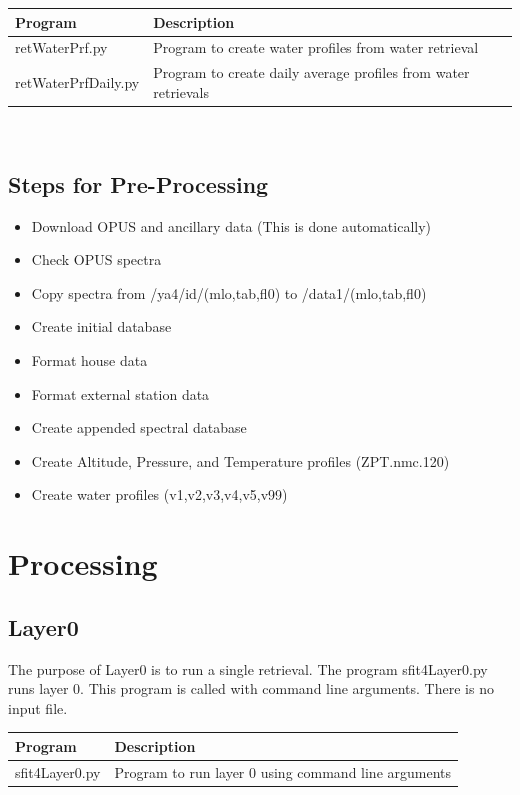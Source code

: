 \documentclass[12pt, letterpaper]{article}
\begin{document}
\begin{tabular}{ l l }
\textbf{Program} & \textbf{Description} \\
\hline
retWaterPrf.py      & Program to create water profiles from water retrieval\\
retWaterPrfDaily.py & Program to create daily average profiles from water retrievals\\
\end{tabular} \\


\subsection{Steps for Pre-Processing}
\label{sec:SCSD}

\begin{itemize}
\item Download OPUS and ancillary data (This is done automatically)
\item Check OPUS spectra
\item Copy spectra from /ya4/id/(mlo,tab,fl0) to /data1/(mlo,tab,fl0)
\item Create initial database
\item Format house data
\item Format external station data
\item Create appended spectral database
\item Create Altitude, Pressure, and Temperature profiles (ZPT.nmc.120)
\item Create water profiles (v1,v2,v3,v4,v5,v99)
\end{itemize}


\section{Processing}
\subsection{Layer0}
The purpose of Layer0 is to run a single retrieval. The program sfit4Layer0.py runs layer 0. This program is called with command line arguments. There is no input file.\\ 

\begin{tabular}{ l l }
\textbf{Program} & \textbf{Description} \\
\hline
sfit4Layer0.py      & Program to run layer 0 using command line arguments\\
\end{tabular} \\
\end{document}
